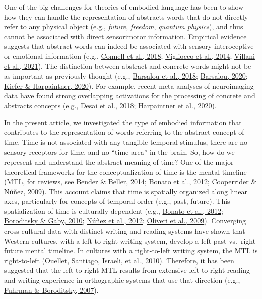 \documentclass[
  a4paper,12pt,twoside,onecolumn,openright,final,oldfontcommands]{memoir}
\begin{document}
One of the big challenges for theories of embodied language has been to show how they can handle the representation of abstracts words that do not directly refer to any physical object (e.g., \emph{future}, \emph{freedom}, \emph{quantum physics}), and thus cannot be associated with direct sensorimotor information. Empirical evidence suggests that abstract words can indeed be associated with sensory interoceptive or emotional information (e.g., \protect\hyperlink{ref-connell_interoception_2018}{Connell et al., 2018}; \protect\hyperlink{ref-vigliocco_neural_2014}{Vigliocco et al., 2014}; \protect\hyperlink{ref-villani_sensorimotor_2021}{Villani et al., 2021}). The distinction between abstract and concrete words might not be as important as previously thought (e.g., \protect\hyperlink{ref-barsalou_moving_2018}{Barsalou et al., 2018}; \protect\hyperlink{ref-barsalou_challenges_2020}{Barsalou, 2020}; \protect\hyperlink{ref-kiefer_varieties_2020}{Kiefer \& Harpaintner, 2020}). For example, recent meta-analyses of neuroimaging data have found strong overlapping activations for the processing of concrete and abstracts concepts (e.g., \protect\hyperlink{ref-desai_multifaceted_2018}{Desai et al., 2018}; \protect\hyperlink{ref-harpaintner_grounding_2020}{Harpaintner et al., 2020}).

In the present article, we investigated the type of embodied information that contributes to the representation of words referring to the abstract concept of time. Time is not associated with any tangible temporal stimulus, there are no sensory receptors for time, and no ``time area'' in the brain. So, how do we represent and understand the abstract meaning of time? One of the major theoretical frameworks for the conceptualization of time is the mental timeline (MTL, for reviews, see \protect\hyperlink{ref-bender_mapping_2014}{Bender \& Beller, 2014}; \protect\hyperlink{ref-bonato_when_2012}{Bonato et al., 2012}; \protect\hyperlink{ref-cooperrider_across_2009}{Cooperrider \& Núñez, 2009}). This account claims that time is spatially organized along linear axes, particularly for concepts of temporal order (e.g., past, future). This spatialization of time is culturally dependent (e.g., \protect\hyperlink{ref-bonato_when_2012}{Bonato et al., 2012}; \protect\hyperlink{ref-boroditsky_remembrances_2010}{Boroditsky \& Gaby, 2010}; \protect\hyperlink{ref-nunez_contours_2012}{Núñez et al., 2012}; \protect\hyperlink{ref-oliveri_representation_2009}{Oliveri et al., 2009}). Converging cross-cultural data with distinct writing and reading systems have shown that Western cultures, with a left-to-right writing system, develop a left-past vs.~right-future mental timeline. In cultures with a right-to-left writing system, the MTL is right-to-left (\protect\hyperlink{ref-ouellet_is_2010}{Ouellet, Santiago, Israeli, et al., 2010}). Therefore, it has been suggested that the left-to-right MTL results from extensive left-to-right reading and writing experience in orthographic systems that use that direction (e.g., \protect\hyperlink{ref-fuhrman_mental_2007}{Fuhrman \& Boroditsky, 2007}).
\end{document}

